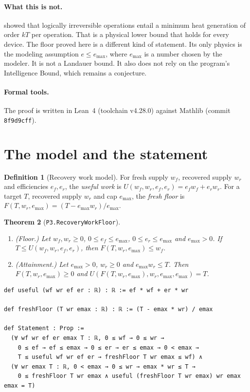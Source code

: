 \documentclass[11pt]{article}
\newtheorem{theorem}{Theorem}
\theoremstyle{definition}
\newtheorem{definition}[theorem]{Definition}
\theoremstyle{remark}
\begin{document}
\paragraph{What this is not.}
\citet{landauer1961} showed that logically irreversible operations entail a minimum heat
generation of order $kT$ per operation. That is a physical lower bound that holds for every
device. The floor proved here is a different kind of statement. Its only physics is the modeling
assumption $e\le e_{\max}$, where $e_{\max}$ is a number chosen by the modeler. It is not a
Landauer bound. It also does not rely on the program's Intelligence Bound, which remains a
conjecture.

\paragraph{Formal tools.}
The proof is written in Lean~4 \citep{moura2021lean4} (toolchain v4.28.0) against Mathlib
\citep{mathlib2020} (commit \texttt{8f9d9cff}).

\section{The model and the statement}
\label{sec:model}
\begin{definition}[Recovery work model]
For fresh supply $w_f$, recovered supply $w_r$ and efficiencies $e_f,e_r$, the \emph{useful work}
is $U(w_f,w_r,e_f,e_r)=e_fw_f+e_rw_r$. For a target $T$, recovered supply $w_r$ and cap
$e_{\max}$, the \emph{fresh floor} is $F(T,w_r,e_{\max})=(T-e_{\max}w_r)/e_{\max}$.
\end{definition}

\begin{theorem}[\texttt{P3.RecoveryWorkFloor}]\label{thm:main}
\begin{enumerate}
\item (Floor.) Let $w_f,w_r\ge0$, $0\le e_f\le e_{\max}$, $0\le e_r\le e_{\max}$ and $e_{\max}>0$.
If $T\le U(w_f,w_r,e_f,e_r)$, then $F(T,w_r,e_{\max})\le w_f$.
\item (Attainment.) Let $e_{\max}>0$, $w_r\ge0$ and $e_{\max}w_r\le T$. Then
$F(T,w_r,e_{\max})\ge0$ and $U(F(T,w_r,e_{\max}),w_r,e_{\max},e_{\max})=T$.
\end{enumerate}
\end{theorem}

\begin{lstlisting}[caption={Definitions and \texttt{Statement} from the sealed module \texttt{ViridisStatements.P3.RecoveryWorkFloor} (docstrings omitted).}]
def useful (wf wr ef er : ℝ) : ℝ := ef * wf + er * wr

def freshFloor (T wr emax : ℝ) : ℝ := (T - emax * wr) / emax

def Statement : Prop :=
  (∀ wf wr ef er emax T : ℝ, 0 ≤ wf → 0 ≤ wr →
    0 ≤ ef → ef ≤ emax → 0 ≤ er → er ≤ emax → 0 < emax →
    T ≤ useful wf wr ef er → freshFloor T wr emax ≤ wf) ∧
  (∀ wr emax T : ℝ, 0 < emax → 0 ≤ wr → emax * wr ≤ T →
    0 ≤ freshFloor T wr emax ∧ useful (freshFloor T wr emax) wr emax emax = T)
\end{lstlisting}
\end{document}
